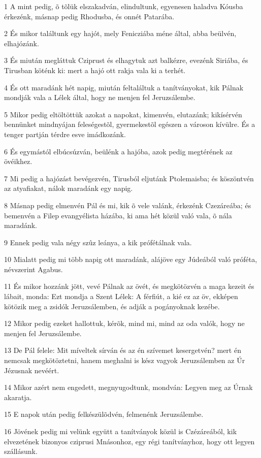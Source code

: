 \par 1 A mint pedig, õ tõlük elszakadván, elindultunk, egyenesen haladva Kóusba érkezénk, másnap pedig Rhodusba, és onnét Patarába.
\par 2 És mikor találtunk egy hajót, mely Fenicziába méne által, abba beülvén, elhajózánk.
\par 3 És miután megláttuk Cziprust és elhagytuk azt balkézre, evezénk Siriába, és Tirusban köténk ki: mert a hajó ott rakja vala ki a terhét.
\par 4 És ott maradánk hét napig, miután feltaláltuk a tanítványokat, kik Pálnak mondják vala a Lélek által, hogy ne menjen fel  Jeruzsálembe.
\par 5 Mikor pedig eltöltöttük azokat a napokat, kimenvén, elutazánk; kikísérvén bennünket mindnyájan feleségestõl, gyermekestõl egészen a városon kívülre. És a tenger partján térdre esve imádkozánk.
\par 6 És egymástól elbúcsúzván, beülénk a hajóba, azok pedig megtérének az övéikhez.
\par 7 Mi pedig a hajózást bevégezvén, Tirusból eljutánk Ptolemaisba; és köszöntvén az atyafiakat, nálok maradánk egy napig.
\par 8 Másnap pedig elmenvén Pál és mi, kik õ vele valánk, érkezénk Czezáreába; és bemenvén a Filep evangyélista házába, ki ama hét közül való vala, õ nála maradánk.
\par 9 Ennek pedig vala négy szûz leánya, a kik prófétálnak vala.
\par 10 Mialatt pedig mi több napig ott maradánk, alájöve egy Júdeából való próféta, névszerint Agabus.
\par 11 És mikor hozzánk jött, vevé Pálnak az övét, és megkötözvén a maga kezeit és lábait, monda: Ezt mondja a Szent Lélek: A férfiút, a kié ez az öv, ekképen kötözik meg a zsidók Jeruzsálemben, és adják a pogányoknak kezébe.
\par 12 Mikor pedig ezeket hallottuk, kérõk, mind mi, mind az oda valók, hogy ne menjen fel Jeruzsálembe.
\par 13 De Pál felele: Mit míveltek sírván és az én szívemet kesergetvén? mert én nemcsak megkötöztetni, hanem meghalni is kész vagyok Jeruzsálemben az Úr Jézusnak nevéért.
\par 14 Mikor azért nem engedett, megnyugodtunk, mondván: Legyen meg az Úrnak akaratja.
\par 15 E napok után pedig felkészülõdvén, felmenénk Jeruzsálembe.
\par 16 Jövének pedig mi velünk együtt a tanítványok közül is Czézáreából, kik elvezetének bizonyos cziprusi Mnásonhoz, egy régi tanítványhoz, hogy ott legyen szállásunk.
